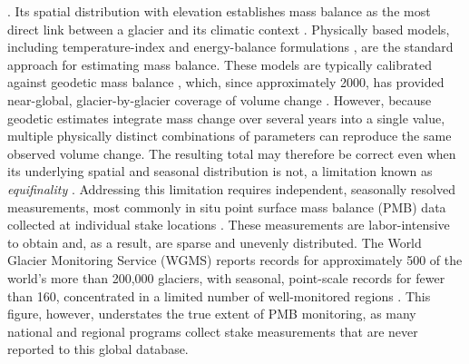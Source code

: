 \documentclass[draft]{agujournal2019}
\begin{document}
 \citep{Cogley_2011} \citep{Cogley_2011, Cuffey_and_Paterson2010}.  Its spatial distribution with elevation establishes  mass balance as the most direct link between a glacier and its climatic context \citep{Oerlemans_2001, Cogley_2011, Benn_2014}. Physically based models, including temperature-index and energy-balance formulations \citep[e.g.,][]{Hock_2005, Huss_2008, Huss_2015}, are the standard approach for estimating mass balance. These models are typically calibrated against geodetic mass balance \citep{Zekollari_2024}, which, since approximately 2000, has provided near-global, glacier-by-glacier coverage of volume change \citep[e.g.,][]{Dussaillant_2019, Hugonnet_2021, Berthier_2023, GlaMBIE_2025}. However, because geodetic estimates integrate mass change over several years into a single value, multiple physically distinct combinations of parameters can reproduce the same observed volume change. The resulting total may therefore be correct even when its underlying spatial and seasonal distribution is not, a limitation known as \textit{equifinality} \citep{Finger_2011, Gabbi_2014, Rounce_2020, Cremona_2026}. Addressing this limitation requires independent, seasonally resolved measurements, most commonly in situ point surface mass balance (PMB) data collected at individual stake locations \citep{Radic_2011, Farinotti_2015, Vincent_2017}. These measurements are labor-intensive to obtain and, as a result, are sparse and unevenly distributed. The World Glacier Monitoring Service (WGMS) reports records for approximately 500 of the world's more than 200,000 glaciers, with seasonal, point-scale records for fewer than 160, concentrated in a limited number of well-monitored regions \citep{WGMS2023}. This figure, however, understates the true extent of PMB monitoring, as many national and regional programs collect stake measurements that are never reported to this global database.
\end{document}
